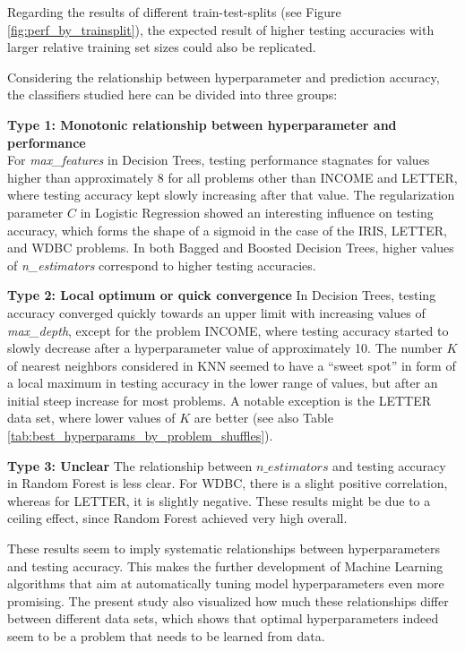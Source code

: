 \documentclass[twoside,11pt]{article}
\begin{document}
		Regarding the results of different train-test-splits (see Figure \ref{fig:perf_by_trainsplit}), the expected result of higher testing accuracies with larger relative training set sizes could also be replicated.
		
		Considering the relationship between hyperparameter and prediction accuracy, the classifiers studied here can be divided into three groups:
		
		\noindent\textbf{Type 1: Monotonic relationship between hyperparameter and performance}\\
		For \textit{max\_features} in Decision Trees, testing performance stagnates for values higher than approximately 8 for all problems other than INCOME and LETTER, where testing accuracy kept slowly increasing after that value. The regularization parameter $C$ in Logistic Regression showed an interesting influence on testing accuracy, which forms the shape of a sigmoid in the case of the IRIS, LETTER, and WDBC problems. In both Bagged and Boosted Decision Trees, higher values of \textit{n\_estimators} correspond to higher testing accuracies.
		
		\noindent\textbf{Type 2: Local optimum or quick convergence}
		In Decision Trees, testing accuracy converged quickly towards an upper limit with increasing values of \textit{max\_depth}, except for the problem INCOME, where testing accuracy started to slowly decrease after a hyperparameter value of approximately 10. The number $K$ of nearest neighbors considered in KNN seemed to have a ``sweet spot'' in form of a local maximum in testing accuracy in the lower range of values, but after an initial steep increase for most problems. A notable exception is the LETTER data set, where lower values of $K$ are better (see also Table \ref{tab:best_hyperparams_by_problem_shuffles}).
		
		\noindent\textbf{Type 3: Unclear}
		The relationship between $n\_estimators$ and testing accuracy in Random Forest is less clear. For WDBC, there is a slight positive correlation, whereas for LETTER, it is slightly negative. These results might be due to a ceiling effect, since Random Forest achieved very high overall.
		
		These results seem to imply systematic relationships between hyperparameters and testing accuracy. This makes the further development of Machine Learning algorithms that aim at automatically tuning model hyperparameters even more promising. The present study also visualized how much these relationships differ between different data sets, which shows that optimal hyperparameters indeed seem to be a problem that needs to be learned from data.
	
\end{document}
